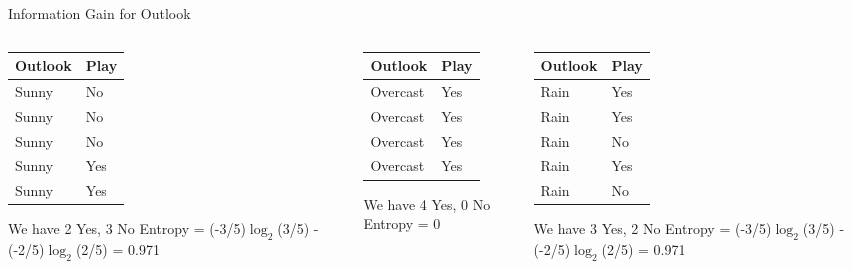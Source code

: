 \documentclass[usenames,dvipsnames]{beamer}
\begin{document}
\begin{frame}{Information Gain for Outlook}
\begin{columns}


\begin{column}{.32\textwidth}
	\begin{table}
\begin{tabular}{l|l} \toprule
	\textbf{Outlook} & \textbf{Play} \\ \midrule
	Sunny    & No   \\
	Sunny    & No   \\
	Sunny    & No   \\
	Sunny    & Yes  \\
	Sunny    & Yes  \\

\bottomrule
\end{tabular}
We have 2 Yes, 3 No
Entropy = (-3/5)$\log_{2}$(3/5) - (-2/5)$\log_{2}$(2/5) = 0.971
\end{table}
\end{column}

\pause \begin{column}{.32\textwidth}
	\begin{table}


\begin{tabular}{l|l} \toprule
	\textbf{Outlook} & \textbf{Play} \\ \midrule

	Overcast & Yes  \\
	Overcast & Yes  \\
	Overcast & Yes  \\
	Overcast & Yes  \\ \bottomrule

\end{tabular}
We have 4 Yes, 0 No
Entropy = 0


	\end{table}


\end{column}


\pause \begin{column}{.32\textwidth}
	\begin{table}
\begin{tabular}{l|l} \toprule
	\textbf{Outlook} & \textbf{Play} \\ \midrule
	Rain     & Yes  \\
	Rain     & Yes  \\
	Rain     & No   \\
	Rain     & Yes  \\
	Rain     & No  \\ \bottomrule
\end{tabular}
We have 3 Yes, 2 No
Entropy = (-3/5)$\log_{2}$(3/5) - (-2/5)$\log_{2}$(2/5) = 0.971
\end{table}
\end{column}
\end{columns}
\end{frame}
\end{document}
